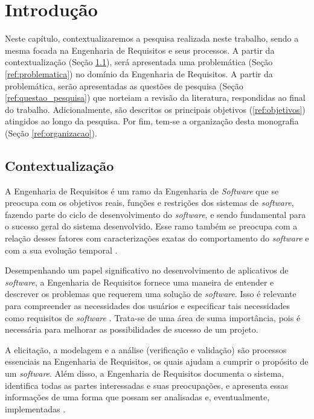 \chapter[Introdução]{Introdução}

Neste capítulo, contextualizaremos a pesquisa realizada neste trabalho, sendo a mesma focada na Engenharia de Requisitos e seus processos. A partir da contextualização (Seção \ref{ref:contextualizacao}), será apresentada uma problemática (Seção \ref{ref:problematica}) no domínio da Engenharia de Requisitos. A partir da problemática, serão apresentadas as questões de pesquisa (Seção \ref{ref:questao_pesquisa}) que norteiam a revisão da literatura, respondidas ao final do trabalho. Adicionalmente, são descritos os principais objetivos (\ref{ref:objetivos}) atingidos ao longo da pesquisa. Por fim, tem-se a organização desta monografia (Seção \ref{ref:organizacao}).

\label{chap:intro}

\section{Contextualização}

\label{ref:contextualizacao}

A Engenharia de Requisitos é um ramo da Engenharia de \textit{Software} que se preocupa com os objetivos reais, funções e restrições dos sistemas de \textit{software}, fazendo parte do ciclo de desenvolvimento do \textit{software}, e sendo fundamental para o sucesso geral do sistema desenvolvido. Esse ramo também se preocupa com a relação desses fatores com caracterizações exatas do comportamento do \textit{software} e com a sua evolução temporal \cite{elliott2012software}.

Desempenhando um papel significativo no desenvolvimento de aplicativos de \textit{software}, a Engenharia de Requisitos fornece uma maneira de entender e descrever os problemas que requerem uma solução de \textit{software}. Isso é relevante para compreender as necessidades dos usuários e especificar tais necessidades como requisitos de \textit{software} \cite{elliott2012software}. Trata-se de uma área de suma importância, pois é necessária para melhorar as possibilidades de sucesso de um projeto.

A elicitação, a modelagem e a análise (verificação e validação) são processos essenciais na Engenharia de Requisitos, os quais ajudam a cumprir o propósito de um \textit{software}. Além disso, a Engenharia de Requisitos documenta o sistema, identifica todas as partes interessadas e suas preocupações, e apresenta essas informações de uma forma que possam ser analisadas e, eventualmente, implementadas \cite{elliott2012software}.

